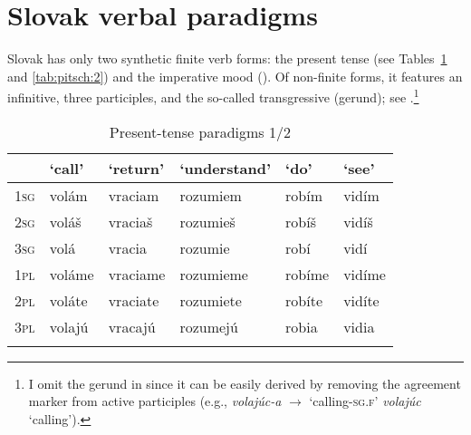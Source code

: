 \documentclass[output=paper,colorlinks,citecolor=brown]{langscibook}
\begin{document}

\section{Slovak verbal paradigms}\label{sec:SlovakVerbs}

Slovak has only two synthetic finite verb forms: the present tense (see Tables~\ref{tab:pitsch:1} and \ref{tab:pitsch:2}) and the imperative mood (). Of non-finite forms, it features an infinitive, three participles, and the so-called transgressive (gerund); see .\footnote{I omit the gerund in  since it can be easily derived by removing the agreement marker from active participles (e.g., \textit{volajúc-a} $\rightarrow$ `calling-\textsc{sg.f}' \textit{volajúc} `calling').}


\begin{table}[H]
\caption{Present-tense paradigms 1/2}
\label{tab:pitsch:1}
 \begin{tabular}{llllll}
  \lsptoprule
            & `call' & `return' & `understand' & `do' & `see' \\
  \midrule
  \textsc{1sg} & volám & vraciam & rozumiem & robím & vidím \\
  \textsc{2sg} & voláš & vraciaš & rozumieš & robíš & vidíš \\
  \textsc{3sg} & volá & vracia & rozumie & robí & vidí \\
  \textsc{1pl} & voláme & vraciame & rozumieme & robíme & vidíme \\
  \textsc{2pl} & voláte & vraciate & rozumiete & robíte & vidíte \\
  \textsc{3pl} & volajú & vracajú & rozumejú & robia & vidia \\
  \lspbottomrule
 \end{tabular}
\end{table}

\end{document}
